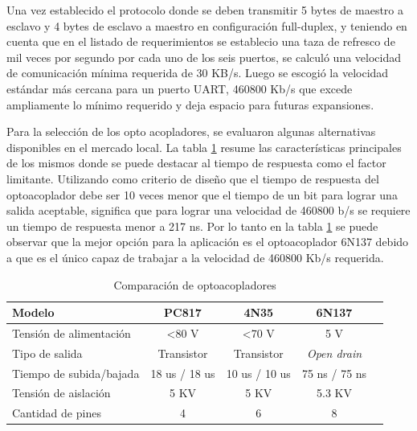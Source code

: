 Una vez establecido el protocolo donde se deben transmitir 5 bytes de maestro a esclavo y 4 bytes de esclavo a maestro en configuración full-duplex, y teniendo en cuenta que en el listado de requerimientos se establecio una taza de refresco de mil veces por segundo por cada uno de los seis puertos, se calculó una velocidad de comunicación mínima requerida de 30 KB/s. Luego se escogió la velocidad estándar más cercana para un puerto UART, 460800 Kb/s que excede ampliamente lo mínimo requerido y deja espacio para futuras expansiones.

Para la selección de los opto acopladores, se evaluaron algunas alternativas disponibles en el mercado local. La tabla \ref{tab:Optos} resume las características principales de los mismos donde se puede destacar al tiempo de respuesta como el factor limitante. 
Utilizando como criterio de diseño que el tiempo de respuesta del optoacoplador debe ser 10 veces menor que el tiempo de un bit para lograr una salida aceptable, significa que para lograr una velocidad de 460800 b/s se requiere un tiempo de respuesta menor a 217 ns. Por lo tanto en la tabla \ref{tab:Optos} se puede observar que la mejor opción para la aplicación es el optoacoplador 6N137 debido a que es el único capaz de trabajar a la velocidad de 460800 Kb/s requerida.

	\begin{table}[h]
	\centering
	\caption[Tabla de comparación de optoacopladores para la interfaz UART optoaislada]{Comparación de optoacopladores}
	\begin{tabular}{l c c c c}    
		\toprule
		\textbf{Modelo} 	 & \textbf{PC817\citep{PC817}} & \textbf{4N35\citep{4N35}}& \textbf{6N137\citep{6N137}}	\\
		\midrule
Tensión de alimentación             & \textless{}80 V & \textless{}70 V & 5 V           &  \\
Tipo de salida                      & Transistor      & Transistor      & \emph{Open drain}    &  \\
Tiempo de subida/bajada  & 18 us / 18 us   & 10 us / 10 us   & 75 ns / 75 ns &  \\
Tensión de aislación                & 5 KV            & 5 KV            & 5.3 KV        &  \\
Cantidad de pines                   & 4               & 6               & 8             & \\
		\bottomrule
		\hline
	\end{tabular}
	\label{tab:Optos}
\end{table}

